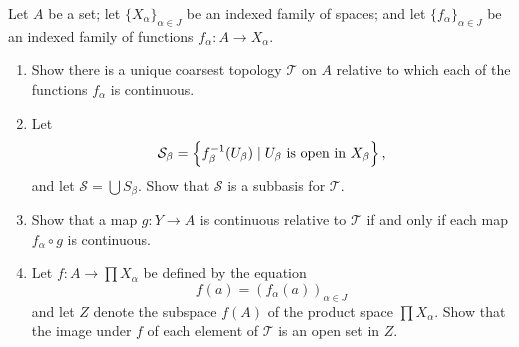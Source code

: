 \begin{exercise}[ID=2.19.10]
    Let $A$ be a set; let $\{X_\alpha\}_{\alpha \in J}$ be an indexed family of spaces; and let $\{f_\alpha\}_{\alpha \in J}$ be an indexed family of functions $f_\alpha: A \rightarrow X_\alpha$.

    \begin{enumerate}[label={(\alph*)}, align=left, leftmargin=\parindent, listparindent=\parindent, labelwidth=0pt, itemindent=!]
        \item Show there is a unique coarsest topology $\mathcal{T}$ on $A$ relative to which each of the functions $f_\alpha$ is continuous.
        \item Let
        \begin{equation*}
            \mathcal{S}_\beta = \left\{f_\beta^{-1}(U_\beta) \mid U_\beta \text{ is open in } X_\beta\right\},
        \end{equation*}
        and let $\mathcal{S} = \bigcup S_\beta$.
        Show that $\mathcal{S}$ is a subbasis for $\mathcal{T}$.
        \item Show that a map $g: Y \rightarrow A$ is continuous relative to $\mathcal{T}$ if and only if each map $f_\alpha \circ g$ is continuous.
        \item Let $f: A \rightarrow \prod X_\alpha$ be defined by the equation
        \begin{equation*}
            f(a) = (f_\alpha(a))_{\alpha \in J}
        \end{equation*}
        and let $Z$ denote the subspace $f(A)$ of the product space $\prod X_\alpha$.
        Show that the image under $f$ of each element of $\mathcal{T}$ is an open set in $Z$.
    \end{enumerate}
\end{exercise}

